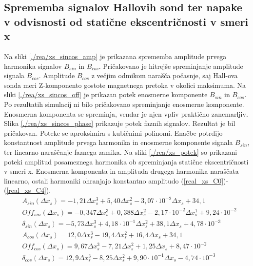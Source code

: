 \subsection{Sprememba signalov Hallovih sond ter napake v odvisnosti od statične ekscentričnosti v smeri x}
Na sliki \ref{./rea/xs_sincos_amp} je prikazana sprememba amplitude prvega harmonika signalov $B_{sin}$ in $B_{cos}$. Pričakovano je hitrejše spreminjanje amplitude signala $B_{cos}$. Amplitude $B_{cos}$ z večjim odmikom narašča počasnje, saj Hall-ova sonda meri Z-komponento gostote magnetnega pretoka v okolici maksimuma.  Na sliki \ref{./rea/xs_sincos_off} je prikazan potek enosmerne komponente $B_{sin}$ in $B_{cos}$. Po rezultatih simulacij ni bilo pričakovano spreminjanje enosmerne komponente. Enosmerna komponenta se spreminja, vendar je njen vpliv praktično zanemarljiv. Slika \ref{./rea/xs_sincos_phase} prikazuje potek faznih signalov. Rezultat je bil pričakovan.
\newpage
Poteke se aproksimira s kubičnimi polinomi. Enačbe potrdijo konstantnost amplitude prvega harmonika in enosmerne komponente signala $B_{sin}$, ter linearno naraščanje faznega zamika.
Na sliki \ref{./rea/xs_potek} so prikazani poteki amplitud posameznega harmonika ob spreminjanja statične ekscentričnosti v smeri x. Enosmerna komponenta in amplituda drugega harmonika naraščata linearno, ostali harmoniki ohranjajo konstantno amplitudo (\ref{real_xs_C0})-(\ref{real_xs_C4}).
\begin{eqnarray}
&A_{sin}(\Delta x_s) = -1,21            \Delta x_s^3+5,40\Delta x_s^2-3,07\cdot 10^{-2}\Delta x_s+34,1                \\      
&Off_{sin}(\Delta x_s) = -0,347\Delta x_s^3+0,388\Delta x_s^2-2,17\cdot 10^{-2}\Delta x_s^1+9,24\cdot 10^{-2}            \\ 
&\delta_{sin}(\Delta x_s) = -5,73            \Delta x_s^3+4,18\cdot 10^{-1}\Delta x_s^2+38,1    \Delta x_s+4,78\cdot 10^{-3}            \\
&A_{cos}(\Delta x_s) = 12,0   \Delta x_s^3-19,4\Delta x_s^2+16,4\Delta x_s+34,1           \\       
&Off_{cos}(\Delta x_s) = 9,67            \Delta x_s^3-7,21\Delta x_s^2+1,25\Delta x_s+8,47\cdot 10^{-2}            \\    
&\delta_{cos}(\Delta x_s) = 12,9    \Delta x_s^3-8,25            \Delta x_s^2+9,90\cdot 10^{-1}\Delta x_s-4,74\cdot 10^{-3}  
\end{eqnarray}
